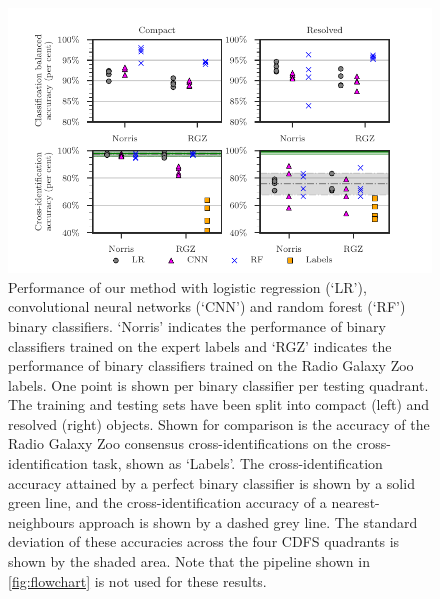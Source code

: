 \documentclass[fleqn,usenatbib,usedcolumn]{mnras}
\newcommand{\edited}[1]{#1}
\begin{document}
    \begin{figure}
    \centering
    \includegraphics[]{images/cdfs-grid-new.pdf}
    \caption{Performance of our method with logistic regression (`LR'), convolutional neural networks (`CNN') and random forest (`RF') binary classifiers. `Norris' indicates the performance of binary classifiers trained on the expert labels and `RGZ' indicates the performance of binary classifiers trained on the Radio Galaxy Zoo labels. One point is shown per binary classifier per testing quadrant. The training and testing sets have been split into compact (left) and resolved (right) objects. \edited{Shown for comparison is the accuracy of the Radio Galaxy Zoo consensus cross-identifications on the cross-identification task, shown as `Labels'.} The cross-identification accuracy attained by a perfect binary classifier is shown by a solid green line, and the cross-identification accuracy of a nearest-neighbours approach is shown by a dashed grey line. The standard deviation of these accuracies across the four CDFS quadrants is shown by the shaded area. Note that the pipeline shown in \autoref{fig:flowchart} is not used for these results. \label{fig:ba}}
    \end{figure}
\end{document}
